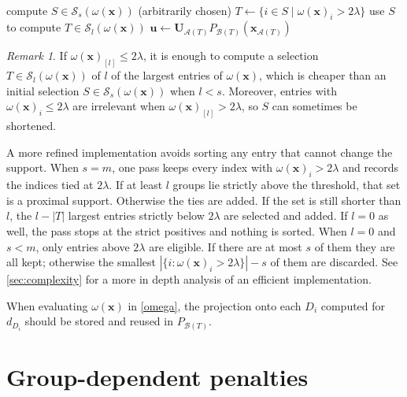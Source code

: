 \documentclass[11pt,a4paper]{article}
\theoremstyle{plain}
\theoremstyle{definition}
\theoremstyle{remark}
\newtheorem{remark}{Remark}
\newcommand*\R{\mathbb{R}}
\newcommand*\x{\mathbf{x}}
\newcommand*\U{\mathbf{u}}
\newcommand*\prox{\operatorname{prox}}
\begin{document}
\begin{algorithm}[ht]
  \caption{Group-sparse proximal mapping}
  \label{alg:proxh}
  \Input{\(\x\in\R^n\),\ \(l\leq s\leq m\) and \(\lambda \in \R\)}\\
  \Output{\(\U\in\prox_h(\x)\)}
  \begin{algorithmic}[1]
    \State compute \(S\in \mathcal{S}_{s}(\omega(\x))\) (arbitrarily chosen)
    \If{\(\omega(\x)_{[l]} >2\lambda\)}
    \State \(T\gets\{i\in S\mid\omega(\x)_i >2\lambda\}\)
    \Else
    \State use \(S\) to compute \(T\in \mathcal{S}_l(\omega(\x))\)
    \EndIf
    \State \(\U\gets \mathbf{U}_{\mathcal{A}(T)} P_{\mathcal{B}(T)}\left(\x_{\mathcal{A}(T)}\right)\)
  \end{algorithmic}
\end{algorithm}

\begin{remark}
  If \(\omega(\x)_{[l]} \leq 2\lambda\), it is enough to compute a selection \(T\in\mathcal{S}_l(\omega(\x))\) of \(l\) of the largest entries of \(\omega(\x)\), which is cheaper than an initial selection \(S\in\mathcal{S}_s(\omega(\x))\) when \(l<s\).
  Moreover, entries with \(\omega(\x)_i \leq 2\lambda\) are irrelevant when \(\omega(\x)_{[l]} > 2\lambda\), so \(S\) can sometimes be shortened.

  A more refined implementation avoids sorting any entry that cannot change the support.
  When \(s=m\), one pass keeps every index with \(\omega(\x)_i>2\lambda\) and records the indices tied at \(2\lambda\).
  If at least \(l\) groups lie strictly above the threshold, that set is a proximal support.
  Otherwise the ties are added.
  If the set is still shorter than \(l\), the \(l-|T|\) largest entries strictly below \(2\lambda\) are selected and added.
  If \(l=0\) as well, the pass stops at the strict positives and nothing is sorted.
  When \(l=0\) and \(s<m\), only entries above \(2\lambda\) are eligible.
  If there are at most \(s\) of them they are all kept; otherwise the smallest \(|\{i:\omega(\x)_i>2\lambda\}|-s\) of them are discarded.
  See \autoref{sec:complexity} for a more in depth analysis of an efficient implementation.

  When evaluating \(\omega(\x)\) in \eqref{omega}, the projection onto each \(D_i\) computed for \(d_{D_i}\) should be stored and reused in \(P_{\mathcal{B}(T)}\).
\end{remark}

\section{Group-dependent penalties}
\label{sec:weights}
\end{document}
